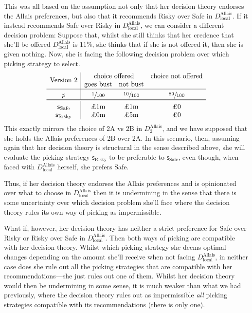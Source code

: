 \documentclass[a4paper,final]{article}
\newcommand\Tstrut{\rule{0pt}{2.6ex}}       %
\newcommand\Bstrut{\rule[-0.9ex]{0pt}{0pt}} %
\newcommand\s{\mathsf{s}}
\newenvironment{CCM rewritten}
{\begingroup\color{blue}} %
{\endgroup}              %
\begin{document}
This was all based on the assumption not only that her decision theory endorses the Allais preferences, but also that it recommends Risky over Safe in $D^{\mathrm{Allais}}_{\mathrm{local}}$. If it instead recommends Safe over Risky in $D^{\mathrm{Allais}}_{\mathrm{local}}$, we can consider a different decision problem: Suppose that, whilst she still thinks that her credence that she'll be offered $D^{\mathrm{Allais}}_{\mathrm{local}}$ is $11\%$, she thinks that if she is not offered it, then she is given nothing. 
Now, she is facing the following decision problem over which picking strategy to select. 
$$
\begin{array}{c|ccc}
	\multirow{2}{*}{\text{Version 2}}	&\multicolumn{2}{c}{\text{choice offered}}&\text{choice not offered}\\
	& \text{goes bust} &  \text{not bust}  \Bstrut \\\hline \Tstrut	p&  \sfrac{1}{100} &  \sfrac{10}{100} &  \sfrac{89}{100} \Bstrut \\\hline \hline\Tstrut 
	\s_{\mathrm{Safe}} & \text{\pounds 1m}&\text{\pounds 1m}         &\text{\pounds 0}               \\
	\s_{\mathrm{Risky}}& \text{\pounds 0m}&\text{\pounds 5m}& \text{\pounds 0}
\end{array}
$$
This exactly mirrors the choice of 2A vs 2B in $D^{\mathrm{Allais}}_2$, and we have supposed that she holds the Allais preferences of 2B over 2A. In this scenario, then, assuming again that her decision theory is structural in the sense described above, she will evaluate the picking strategy $\s_{\mathrm{Risky}}$ to be preferable to $\s_{\mathrm{Safe}}$, even though, when faced with  $D^{\mathrm{Allais}}_{\mathrm{local}}$ herself, she prefers Safe. %

Thus, if her decision theory endorses the Allais preferences and is opinionated over what to choose in $D^{\mathrm{Allais}}_{\mathrm{local}}$ then it is undermining in the sense that there is some uncertainty over which decision problem she'll face where the decision theory rules its own way of picking as impermissible. 

What if, however, her decision theory has neither a strict preference for Safe over Risky or Risky over Safe in $D^{\mathrm{Allais}}_{\mathrm{local}}$. Then both ways of picking are compatible with her decision theory. Whilst which picking strategy she deems optimal changes depending on the amount she'll receive when not facing $D^{\mathrm{Allais}}_{\mathrm{local}}$, in neither case does she rule out all the picking strategies that are compatible with her recommendations---she just rules out one of them. Whilst her decision theory would then be undermining in some sense, it is much weaker than what we had previously, where the decision theory rules out as impermissible \textit{all} picking strategies compatible with its recommendations (there is only one).%
\end{document}
